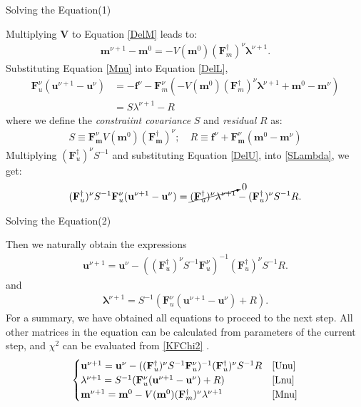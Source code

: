 \documentclass[
	xcolor=dvipsnames,
	aspectratio=169,	
	10pt, 
	]{beamer}
\begin{document}
\begin{frame}{Solving the Equation(1)}
	\begin{block}{}
		Multiplying \textbf V to Equation \eqref{DelM} leads to:	
		\begin{align}
			\mathbf{m}^{\nu+1}-\mathbf{m}^0=-V(\mathbf m^0)(\mathbf{F}_m^\dagger)^\nu\mathbf\lambda^{\nu+1}.\label{Mnu}
		\end{align}
		Substituting Equation \eqref{Mnu} into Equation \eqref{DelL}, 
		\begin{align}
			\mathbf F^\nu_u(\mathbf u^{\nu+1}-\mathbf u^\nu) &= - \mathbf f^\nu - \mathbf F^\nu_m (-V(\mathbf m^0)(\mathbf{F}_m^\dagger)^\nu\mathbf\lambda^{\nu+1} +\mathbf{m}^0-\mathbf{m}^\nu  )\nonumber\\
			&=  S\lambda^{\nu+1}  - R\label{SLambda}
		\end{align}
		where we define the \textit{constraiint covariance} $S$ and \textit{residual} $R$ as:
		\begin{align}
		S\equiv \mathbf{F}_\mathbf{m}^\nu V(\mathbf m^0)(\mathbf{F}_\mathbf{m}^\dagger )^\nu;\quad R\equiv \mathbf f^\nu + \mathbf{F}_\mathbf{m}^\nu(\mathbf{m}^0-\mathbf{m}^\nu)
		\end{align}
		  Multiplying $(\mathbf{F}_u^\dagger)^\nu S^{-1}$ and substituting Equation \eqref{DelU}, into \eqref{SLambda}, we get:
		\begin{align}
			(\mathbf{F}_u^\dagger)^\nu S^{-1}\mathbf F^\nu_u(\mathbf u^{\nu+1}-\mathbf u^\nu) = \cancelto{0}{(\mathbf F_u^\dagger)^\nu\mathbf \lambda^{\nu+1}}-(\mathbf{F}_u^\dagger)^\nu S^{-1}R.
		\end{align}
	\end{block}
\end{frame}
\begin{frame}{Solving the Equation(2)}
	\begin{block}{}
		Then we naturally obtain the expressions
		\begin{align}
			\mathbf{u}^{\nu+1}=\mathbf{u}^\nu - ((\mathbf{F}_u^\dagger)^\nu S^{-1}\mathbf F^\nu_u)^{-1}(\mathbf{F}_u^\dagger)^\nu S^{-1}R\label{Unu}.
		\end{align} 
		and 
		\begin{align}
			\mathbf\lambda^{\nu+1} = S^{-1}(\mathbf F^\nu_u(\mathbf u^{\nu+1}-\mathbf u^\nu) + R)\label{Lnu}.
		\end{align}
		For a summary, we have obtained all equations to proceed to the next step. All other matrices in the equation can be calculated from parameters of the current step, and $\chi^2$ can be evaluated from \eqref{KFChi2} .
		\begin{align*}
			\begin{cases}
				\mathbf{u}^{\nu+1}=\mathbf{u}^\nu - ((\mathbf{F}_u^\dagger)^\nu S^{-1}\mathbf F^\nu_u)^{-1}(\mathbf{F}_u^\dagger)^\nu S^{-1}R&\eqref{Unu}\\
				\mathbf\lambda^{\nu+1} = S^{-1}(\mathbf F^\nu_u(\mathbf u^{\nu+1}-\mathbf u^\nu) + R)&\eqref{Lnu}\\
				\mathbf{m}^{\nu+1}=\mathbf{m}^0-V(\mathbf m^0)(\mathbf{F}_m^\dagger)^\nu\mathbf\lambda^{\nu+1}&\eqref{Mnu}
			\end{cases}
		\end{align*}
	\end{block}
\end{frame}
\end{document}
